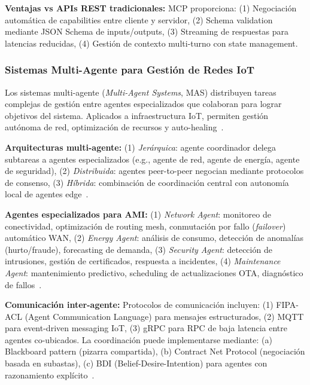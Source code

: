 \textbf{Ventajas vs APIs REST tradicionales:} MCP proporciona: (1) Negociación automática de capabilities entre cliente y servidor, (2) Schema validation mediante JSON Schema de inputs/outputs, (3) Streaming de respuestas para latencias reducidas, (4) Gestión de contexto multi-turno con state management.

\subsubsection{Sistemas Multi-Agente para Gestión de Redes IoT}
\label{sec:marco-estado-multiagente}

Los sistemas multi-agente (\textit{Multi-Agent Systems}, MAS) distribuyen tareas complejas de gestión entre agentes especializados que colaboran para lograr objetivos del sistema. Aplicados a infraestructura IoT, permiten gestión autónoma de red, optimización de recursos y auto-healing~\cite{woldemarianFrameworkSelfHealingSystem2018}.

\textbf{Arquitecturas multi-agente:} (1) \textit{Jerárquica}: agente coordinador delega subtareas a agentes especializados (e.g., agente de red, agente de energía, agente de seguridad), (2) \textit{Distribuida}: agentes peer-to-peer negocian mediante protocolos de consenso, (3) \textit{Híbrida}: combinación de coordinación central con autonomía local de agentes edge~\cite{macasReviewMultiAgentSystems2018}.

\textbf{Agentes especializados para AMI:} (1) \textit{Network Agent}: monitoreo de conectividad, optimización de routing mesh, conmutación por fallo (\textit{failover}) automático WAN, (2) \textit{Energy Agent}: análisis de consumo, detección de anomalías (hurto/fraude), forecasting de demanda, (3) \textit{Security Agent}: detección de intrusiones, gestión de certificados, respuesta a incidentes, (4) \textit{Maintenance Agent}: mantenimiento predictivo, scheduling de actualizaciones OTA, diagnóstico de fallos~\cite{ayaUnleashingIntelligenceEdge2024}.

\textbf{Comunicación inter-agente:} Protocolos de comunicación incluyen: (1) FIPA-ACL (Agent Communication Language) para mensajes estructurados, (2) MQTT para event-driven messaging IoT, (3) gRPC para RPC de baja latencia entre agentes co-ubicados. La coordinación puede implementarse mediante: (a) Blackboard pattern (pizarra compartida), (b) Contract Net Protocol (negociación basada en subastas), (c) BDI (Belief-Desire-Intention) para agentes con razonamiento explícito~\cite{macasReviewMultiAgentSystems2018}.

